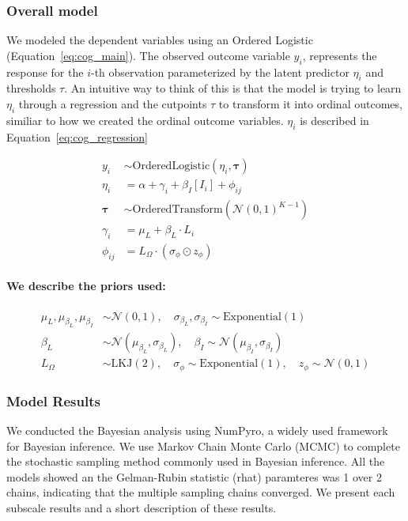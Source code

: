 \subsubsection{Overall model}
We modeled the dependent variables using an Ordered Logistic (Equation~\ref{eq:cog_main}). The observed outcome variable $y_i$, represents the response for the $i$-th observation parameterized by the latent predictor $\eta_i$ and thresholds $\tau$. An intuitive way to think of this is that the model is trying to learn $\eta_i$ through a regression and the cutpoints $\tau$ to transform it into ordinal outcomes, similiar to how we created the ordinal outcome variables. $\eta_i$ is described in Equation~\ref{eq:cog_regression}


\begin{align}
    y_i &\sim \text{OrderedLogistic}(\eta_i, \boldsymbol{\tau}) \label{eq:cog_main}\\
    \eta_i &= \alpha + \gamma_i + \beta_I[I_i] + \phi_{ij} \label{eq:cog_regression}\\
    \boldsymbol{\tau} &\sim \text{OrderedTransform}(\mathcal{N}(0, 1)^{K-1}) \\
    \gamma_i &= \mu_L + \beta_L \cdot L_i \label{eq:cog_ordinal} \\
    \phi_{ij} &= L_{\Omega} \cdot (\sigma_{\phi} \odot z_{\phi}) \label{eq:cog_lkj}
\end{align}


\paragraph{We describe the priors used:}
\begin{align}
    \mu_{L}, \mu_{\beta_L}, \mu_{\beta_I} &\sim \mathcal{N}(0, 1), \quad \sigma_{\beta_L}, \sigma_{\beta_I} \sim \text{Exponential}(1) \label{eq:cog_prior_1} \\
    \beta_L &\sim \mathcal{N}(\mu_{\beta_L}, \sigma_{\beta_L}), \quad \beta_I \sim \mathcal{N}(\mu_{\beta_I}, \sigma_{\beta_I}) \label{eq:cog_prior_2} \\
    L_{\Omega} &\sim \text{LKJ}(2), \quad \sigma_{\phi} \sim \text{Exponential}(1), \quad z_{\phi} \sim \mathcal{N}(0, 1) \label{eq:cog_prior_3} 
\end{align}

\subsubsection{Model Results}
We conducted the Bayesian analysis using NumPyro, a widely used framework for Bayesian inference. We use Markov Chain Monte Carlo (MCMC) to complete the stochastic sampling method commonly used in Bayesian inference. All the models showed an the Gelman-Rubin statistic (rhat) paramteres was 1 over 2 chains, indicating that the multiple sampling chains converged. We present each subscale results and a short description of these results.
